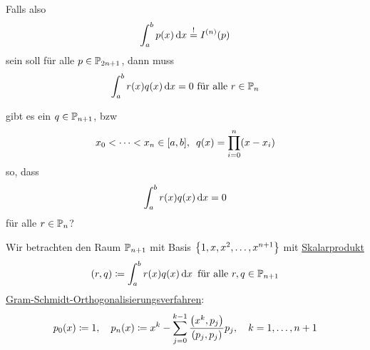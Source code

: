 \documentclass[11pt,a4paper,oneside]{scrartcl}
\begin{document}
Falls also \[
    \int_a^b p(x) \mathop{}\!\mathrm{d} x \overset{!}{=}I^{(n)}(p)\]
sein soll für alle $p\in\mathbb{P}_{2n+1}$, dann muss \[
    \int_a^b r(x) q(x) \mathop{}\!\mathrm{d} x = 0 \text{ für alle $r\in \mathbb{P}_n$}\]
\begin{question}
    gibt es ein $q\in \mathbb{P}_{n+1}$, bzw \[x_0 < \dots < x_n \in [a,b], \hspace{.5em} q(x) = \prod_{i=0}^n(x-x_i)\]
    so, dass \[
        \int_a^b r(x)q(x)\mathop{}\!\mathrm{d} x = 0\]
    für alle $r\in \mathbb{P}_n$?
\end{question}
Wir betrachten den Raum $\mathbb{P}_{n+1}$ mit Basis $\left\{ 1,x,x^2,\dots,x^{n+1} \right\}$ mit
\underline{Skalarprodukt} \[
    (r,q)\coloneqq \int_a^b r(x)q(x)\mathop{}\!\mathrm{d} x\hspace{.5em} \text{für alle }r,q\in\mathbb{P}_{n+1}\]
\underline{Gram-Schmidt-Orthogonalisierungsverfahren}:\[p_0(x) \coloneqq 1, \hspace{1em}
p_n(x) \coloneqq x^k - \displaystyle\sum_{j=0}^{k-1}\frac{\left(x^k, p_j\right)}{\left(p_j,p_j\right)}p_j, \hspace{1em} k = 1,\dots, n+1\]
\end{document}
